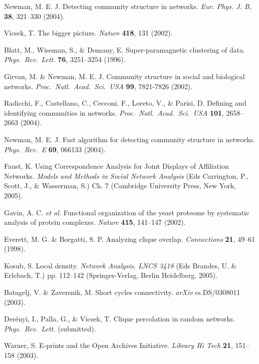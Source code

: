 \documentclass[11pt,a4paper]{article}
\begin{document}
\begin{thebibliography}{99}
Newman, M. E. J.
Detecting community structure in networks.
\textit{Eur. Phys. J. B}, \textbf{38}, 321--330 (2004).

Vicsek, T.
The bigger picture.
\textit{Nature} \textbf{418}, 131 (2002).

Blatt, M., Wiseman, S., \& Domany, E.
Super-paramagnetic clustering of data.
\textit{Phys.\ Rev.\ Lett.} \textbf{76}, 3251--3254 (1996).

Girvan, M. \& Newman, M. E. J.
Community structure in social and biological networks.
\textit{Proc.\ Natl.\ Acad.\ Sci.\ USA} \textbf{99}, 7821-7826 (2002).

Radicchi, F., Castellano, C., Cecconi, F., Loreto, V., \& Parisi, D.
Defining and identifying communities in networks.
\textit{Proc.\ Natl.\ Acad.\ Sci.\ USA} \textbf{101}, 2658--2663 (2004).

Newman, M. E. J.
Fast algorithm for detecting community structure in networks.
\textit{Phys.\ Rev.\ E} \textbf{69}, 066133 (2004).

Faust, K.
Using Correspondence Analysis for Joint Displays of Affiliation Networks.
\textit{Models and Methods in Social Network Analysis}
(Eds Carrington, P., Scott, J., \& Wasserman, S.) Ch. 7
(Cambridge University Press, New York, 2005).

Gavin, A. C. \textit{et al.}
Functional organization of the yeast proteome by systematic analysis of
protein complexes.
\textit{Nature} \textbf{415}, 141--147 (2002).

Everett, M. G. \& Borgatti, S. P.
Analyzing clique overlap.
\textit{Connections} \textbf{21}, 49--61 (1998).

Kosub, S.
Local density.
\textit{Network Analysis, LNCS 3418}
(Eds Brandes, U. \& Erlebach, T.) pp. 112--142
(Springer-Verlag, Berlin Heidelberg, 2005).

Batagelj, V. \& Zaversnik, M.
Short cycles connectivity.
\textit{arXiv} cs.DS/0308011 (2003).

Der{\'e}nyi, I., Palla, G., \& Vicsek, T.
Clique percolation in random networks.
\textit{Phys.\ Rev.\ Lett.} (submitted).

Warner, S.
E-prints and the Open Archives Initiative.
\textit{Library Hi Tech} \textbf{21}, 151--158 (2003).


\end{thebibliography}
\end{document}
